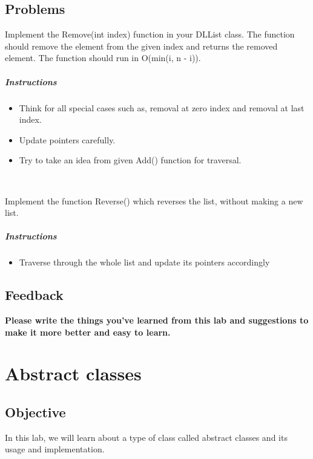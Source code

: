 \documentclass[11pt,fleqn]{book} %
\begin{document}
\section{Problems}
\begin{problem}
	Implement the Remove(int index) function in your DLList class. The function should remove the element from the given index and returns the removed element. The function should run in O(min(i, n - i)).
	\paragraph{Instructions}
	\begin{itemize}
		\item Think for all special cases such as, removal at zero index and removal at last index.
		\item Update pointers carefully.
		\item Try to take an idea from given Add() function for traversal.
	\end{itemize}
\end{problem}
~\\
\begin{problem}
	Implement the function Reverse() which reverses the list, without making a new list.
	\paragraph{Instructions}
	\begin{itemize}
		\item Traverse through the whole list and update its pointers accordingly
	\end{itemize}
\end{problem}
\newpage
\section{Feedback}
\textbf{Please write the things you've learned from this lab and suggestions to make it more better and easy to learn.}

\chapter{Abstract classes}
\section{Objective}
In this lab, we will learn about a type of class called abstract classes and its usage and implementation.
\end{document}
